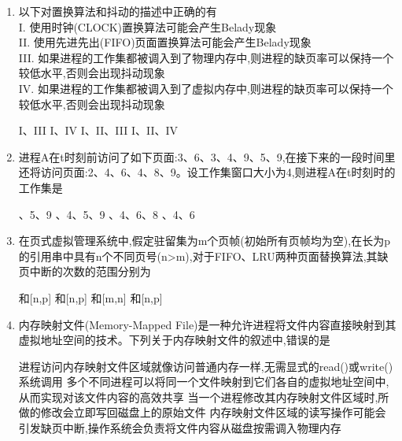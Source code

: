 \documentclass[12pt, a4paper, oneside, UTF8]{ctexbook}
\begin{document}
\begin{enumerate}
    \item 以下对置换算法和抖动的描述中正确的有\\
    I. 使用时钟(CLOCK)置换算法可能会产生Belady现象\\
    II. 使用先进先出(FIFO)页面置换算法可能会产生Belady现象\\
    III. 如果进程的工作集都被调入到了物理内存中,则进程的缺页率可以保持一个较低水平,否则会出现抖动现象\\
    IV. 如果进程的工作集都被调入到了虚拟内存中,则进程的缺页率可以保持一个较低水平,否则会出现抖动现象
    \begin{choices}[1]
    \task I、III
    \task I、IV
    \task I、II、III
    \task I、II、IV
    \end{choices}

    \item 进程A在t时刻前访问了如下页面:3、6、3、4、9、5、9,在接下来的一段时间里还将访问页面:2、4、6、4、8、9。设工作集窗口大小为4,则进程A在t时刻时的工作集是
    \begin{choices}[1]
    、5、9
    、4、5、9
    、4、6、8
    、4、6
    \end{choices}

    \item 在页式虚拟管理系统中,假定驻留集为m个页帧(初始所有页帧均为空),在长为p的引用串中具有n个不同页号(n>m),对于FIFO、LRU两种页面替换算法,其缺页中断的次数的范围分别为
    \begin{choices}[2]
    \task[A] [m,p]和[n,p]
    \task[B] [m,n]和[n,p]
    \task[C] [n,p]和[m,n]
    \task[D] [n,p]和[n,p]
    \end{choices}

    \item 内存映射文件(Memory-Mapped File)是一种允许进程将文件内容直接映射到其虚拟地址空间的技术。下列关于内存映射文件的叙述中,错误的是
    \begin{choices}[1]
    \task 进程访问内存映射文件区域就像访问普通内存一样,无需显式的read()或write()系统调用
    \task 多个不同进程可以将同一个文件映射到它们各自的虚拟地址空间中,从而实现对该文件内容的高效共享
    \task 当一个进程修改其内存映射文件区域时,所做的修改会立即写回磁盘上的原始文件
    \task 内存映射文件区域的读写操作可能会引发缺页中断,操作系统会负责将文件内容从磁盘按需调入物理内存
    \end{choices}


\end{enumerate}
\end{document}
